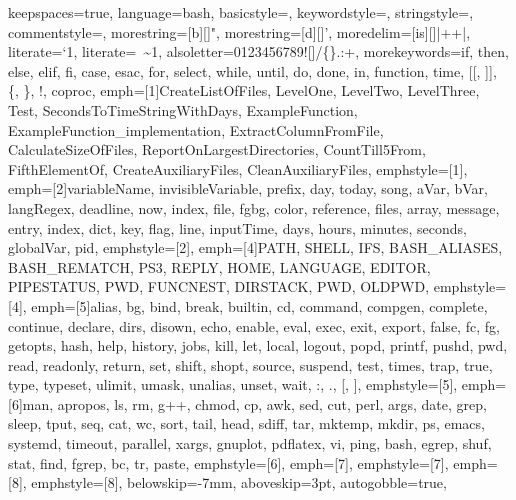 {%
keepspaces=true,                    %
language=bash,
basicstyle=\ttfamily\scriptsize\color{basic-color},
keywordstyle=\color{keywords-color},
stringstyle=\color{strings-color},
commentstyle=\color{comment-color},
morestring=[b][\color{strings-color}]{"},
morestring=[d][\color{strings-color}]{'},
moredelim=[is][\color{basic-color}]{|+}{+|}, %
literate={`}{\textasciigrave}1, %
literate={~}{{\textasciitilde}}1,
alsoletter=0123456789![]/\{\}.:+, %
morekeywords={if, then, else, elif, fi, case, esac, for, select, while, until, do, done, in, function, time, [[, ]], \{, \}, !, coproc}, %
emph=[1]{CreateListOfFiles, LevelOne, LevelTwo, LevelThree, Test, SecondsToTimeStringWithDays, ExampleFunction,
         ExampleFunction_implementation, ExtractColumnFromFile, CalculateSizeOfFiles, ReportOnLargestDirectories,
         CountTill5From, FifthElementOf, CreateAuxiliaryFiles, CleanAuxiliaryFiles},
emphstyle=[1]{\color{functions-color}}, %
emph=[2]{variableName, invisibleVariable, prefix, day, today, song, aVar, bVar, langRegex, deadline, now,
         index, file, fgbg, color, reference, files, array, message, entry, index, dict, key, flag, line, inputTime,
         days, hours, minutes, seconds, globalVar, pid},
emphstyle=[2]{\color{variables-color}}, %
emph=[4]{PATH, SHELL, IFS, BASH_ALIASES, BASH_REMATCH, PS3, REPLY, HOME, LANGUAGE, EDITOR, PIPESTATUS, PWD, FUNCNEST, DIRSTACK, PWD, OLDPWD},
emphstyle=[4]{\color{environment-color}}, %
emph=[5]{alias, bg, bind, break, builtin, cd, command, compgen, complete, continue, declare, dirs, disown, echo, enable, eval,
         exec, exit, export, false, fc, fg, getopts, hash, help, history, jobs, kill, let, local, logout, popd, printf, pushd, pwd,
         read, readonly, return, set, shift, shopt, source, suspend, test, times, trap, true, type, typeset, ulimit, umask,
         unalias, unset, wait, :, ., [, ]},
emphstyle=[5]{\color{builtins-color}}, %
emph=[6]{man, apropos, ls, rm, g++, chmod, cp, awk, sed, cut, perl, args, date, grep, sleep, tput, seq, cat, wc, sort, tail,
         head, sdiff, tar, mktemp, mkdir, ps, emacs, systemd, timeout, parallel, xargs, gnuplot, pdflatex, vi, ping, bash,
         egrep, shuf, stat, find, fgrep, bc, tr, paste},
emphstyle=[6]{\color{external-color}}, %
emph=[7]{},
emphstyle=[7]{\color{variables-color}}, %
emph=[8]{},
emphstyle=[8]{\color{builtins-color}}, %
%
belowskip=-7mm,
aboveskip=3pt,
autogobble=true, %
}

